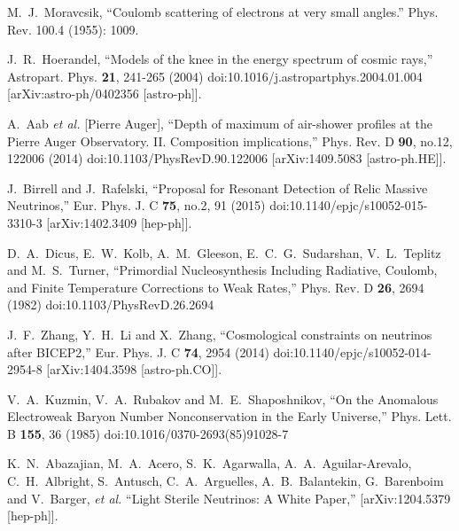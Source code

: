 \begin{thebibliography}{99}
M.~J.~Moravcsik, ``Coulomb scattering of electrons at very small angles.'' Phys. Rev. 100.4 (1955): 1009.

J.~R.~Hoerandel,
``Models of the knee in the energy spectrum of cosmic rays,''
Astropart. Phys. \textbf{21}, 241-265 (2004)
doi:10.1016/j.astropartphys.2004.01.004
[arXiv:astro-ph/0402356 [astro-ph]].

A.~Aab \textit{et al.} [Pierre Auger],
``Depth of maximum of air-shower profiles at the Pierre Auger Observatory. II. Composition implications,''
Phys. Rev. D \textbf{90}, no.12, 122006 (2014)
doi:10.1103/PhysRevD.90.122006
[arXiv:1409.5083 [astro-ph.HE]].

J.~Birrell and J.~Rafelski,
``Proposal for Resonant Detection of Relic Massive Neutrinos,''
Eur. Phys. J. C \textbf{75}, no.2, 91 (2015)
doi:10.1140/epjc/s10052-015-3310-3
[arXiv:1402.3409 [hep-ph]].

D.~A.~Dicus, E.~W.~Kolb, A.~M.~Gleeson, E.~C.~G.~Sudarshan, V.~L.~Teplitz and M.~S.~Turner,
``Primordial Nucleosynthesis Including Radiative, Coulomb, and Finite Temperature Corrections to Weak Rates,''
Phys. Rev. D \textbf{26}, 2694 (1982)
doi:10.1103/PhysRevD.26.2694

J.~F.~Zhang, Y.~H.~Li and X.~Zhang,
``Cosmological constraints on neutrinos after BICEP2,''
Eur. Phys. J. C \textbf{74}, 2954 (2014)
doi:10.1140/epjc/s10052-014-2954-8
[arXiv:1404.3598 [astro-ph.CO]].

V.~A.~Kuzmin, V.~A.~Rubakov and M.~E.~Shaposhnikov,
``On the Anomalous Electroweak Baryon Number Nonconservation in the Early Universe,''
Phys. Lett. B \textbf{155}, 36 (1985)
doi:10.1016/0370-2693(85)91028-7

K.~N.~Abazajian, M.~A.~Acero, S.~K.~Agarwalla, A.~A.~Aguilar-Arevalo, C.~H.~Albright, S.~Antusch, C.~A.~Arguelles, A.~B.~Balantekin, G.~Barenboim and V.~Barger, \textit{et al.}
``Light Sterile Neutrinos: A White Paper,''
[arXiv:1204.5379 [hep-ph]].


\end{thebibliography}

